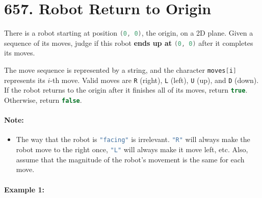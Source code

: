 \section{657. Robot Return to Origin}
There is a robot starting at position \lstinline[language=C++, basicstyle=\small\ttfamily, keywordstyle=\bfseries\color{green!40!black}]|(0, 0)|, the origin, on a 2D plane. Given a sequence of its moves, judge if this robot \textbf{ends up at} \lstinline[language=C++, basicstyle=\small\ttfamily, keywordstyle=\bfseries\color{green!40!black}]|(0, 0)| after it completes its moves.

The move sequence is represented by a string, and the character \lstinline[language=C++, basicstyle=\small\ttfamily, keywordstyle=\bfseries\color{green!40!black}]|moves[i]| represents its $i$-th move. Valid moves are \lstinline[language=Java, basicstyle=\small\ttfamily, keywordstyle=\bfseries\color{green!40!black}]|R| (right), \lstinline[language=Java, basicstyle=\small\ttfamily, keywordstyle=\bfseries\color{green!40!black}]|L| (left), \lstinline[language=Java, basicstyle=\small\ttfamily, keywordstyle=\bfseries\color{green!40!black}]|U| (up), and \lstinline[language=Java, basicstyle=\small\ttfamily, keywordstyle=\bfseries\color{green!40!black}]|D| (down). If the robot returns to the origin after it finishes all of its moves, return \lstinline[language=C++, basicstyle=\small\ttfamily, keywordstyle=\bfseries\color{green!40!black}]|true|. Otherwise, return \lstinline[language=C++, basicstyle=\small\ttfamily, keywordstyle=\bfseries\color{green!40!black}]|false|.

\paragraph{Note:} 
\begin{itemize}
\item The way that the robot is \lstinline[language=Java, basicstyle=\small\ttfamily, keywordstyle=\bfseries\color{green!40!black}]|"facing"| is irrelevant. \lstinline[language=C++, basicstyle=\small\ttfamily, keywordstyle=\bfseries\color{green!40!black}]|"R"| will always make the robot move to the right once, \lstinline[language=C++, basicstyle=\small\ttfamily, keywordstyle=\bfseries\color{green!40!black}]|"L"| will always make it move left, etc. Also, assume that the magnitude of the robot's movement is the same for each move.

\end{itemize}

\paragraph{Example 1:}

